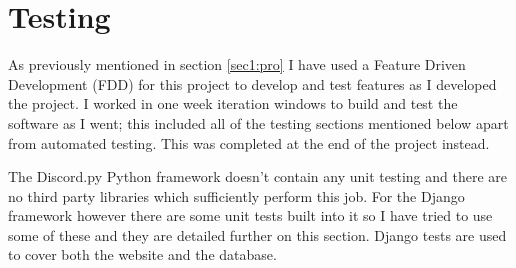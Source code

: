 \chapter{Testing}







As previously mentioned in section \ref{sec1:pro} I have used a Feature Driven Development (FDD) for this project to develop and test features as I developed the project. I worked in one week iteration windows to build and test the software as I went; this included all of the testing sections mentioned below apart from automated testing. This was completed at the end of the project instead.

The Discord.py Python framework doesn't contain any unit testing and there are no third party libraries which sufficiently perform this job. For the Django framework however there are some unit tests built into it so I have tried to use some of these and they are detailed further on this section. Django tests are used to cover both the website and the database. 

